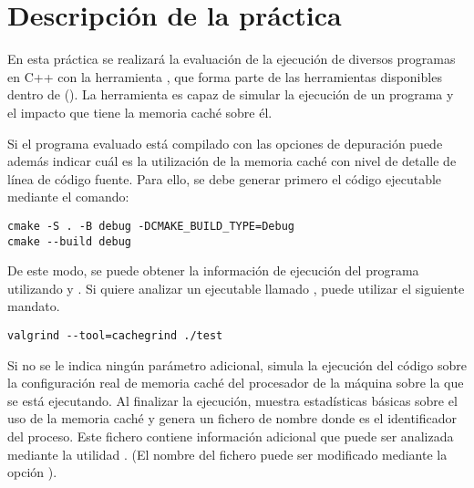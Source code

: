 \section{Descripción de la práctica}

En esta práctica se realizará la evaluación de la ejecución de diversos
programas en C++ con la herramienta , que forma parte de
las herramientas disponibles dentro de 
().  La herramienta es capaz de simular
la ejecución de un programa y el impacto que tiene la memoria caché sobre él. 

Si el programa evaluado está compilado con las opciones de depuración
 puede además
indicar cuál es la utilización de la memoria caché con nivel de detalle de
línea de código fuente.  Para ello, se debe generar primero el código
ejecutable mediante el comando:

\begin{lstlisting}[style=terminal,aboveskip=1em,belowskip=1em]
cmake -S . -B debug -DCMAKE_BUILD_TYPE=Debug
cmake --build debug
\end{lstlisting}

\vspace{1em}

De este modo, se puede obtener la información de ejecución del programa
utilizando  y . Si quiere analizar
un ejecutable llamado , puede utilizar el siguiente mandato.

\begin{lstlisting}[style=terminal,aboveskip=1em,belowskip=1em]
valgrind --tool=cachegrind ./test
\end{lstlisting}

\vspace{1em}

Si no se le indica ningún parámetro adicional,  simula
la ejecución del código sobre la configuración real de memoria caché del
procesador de la máquina sobre la que se está ejecutando. Al finalizar la
ejecución, muestra estadísticas básicas sobre el uso de la memoria caché y
genera un fichero de nombre  donde  es
el identificador del proceso. Este fichero contiene información adicional que
puede ser analizada mediante la utilidad . (El nombre del
fichero puede ser modificado mediante la opción
).

